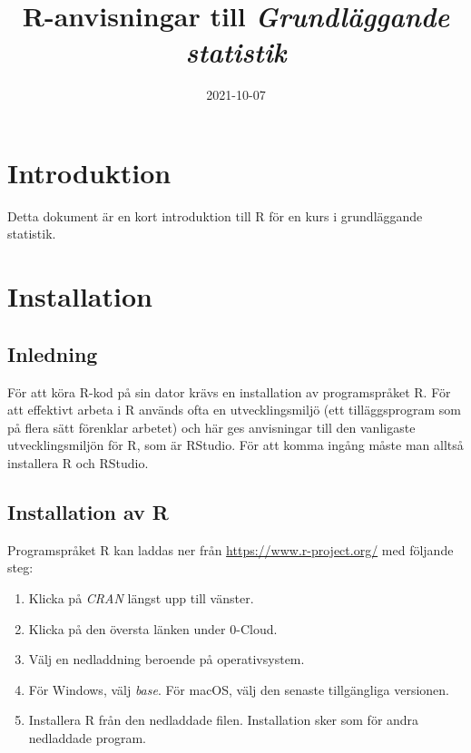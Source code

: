 \documentclass[
]{book}
\title{R-anvisningar till \emph{Grundläggande statistik}}
\author{}
\date{\vspace{-2.5em}2021-10-07}
\providecommand{\tightlist}{%
  \setlength{\itemsep}{0pt}\setlength{\parskip}{0pt}}
\theoremstyle{definition}
\theoremstyle{definition}
\theoremstyle{definition}
\theoremstyle{definition}
\theoremstyle{remark}
\begin{document}
\maketitle

{
\setcounter{tocdepth}{1}
\tableofcontents
}
\hypertarget{introduktion}{%
\chapter{Introduktion}\label{introduktion}}

Detta dokument är en kort introduktion till R för en kurs i grundläggande statistik.

\hypertarget{installation}{%
\chapter{Installation}\label{installation}}

\hypertarget{inledning}{%
\section{Inledning}\label{inledning}}

För att köra R-kod på sin dator krävs en installation av programspråket R. För att effektivt arbeta i R används ofta en utvecklingsmiljö (ett tilläggsprogram som på flera sätt förenklar arbetet) och här ges anvisningar till den vanligaste utvecklingsmiljön för R, som är RStudio. För att komma ingång måste man alltså installera R och RStudio.

\hypertarget{installation-av-r}{%
\section{Installation av R}\label{installation-av-r}}

Programspråket R kan laddas ner från \url{https://www.r-project.org/} med följande steg:

\begin{enumerate}
\def\labelenumi{\arabic{enumi}.}
\tightlist
\item
  Klicka på \emph{CRAN} längst upp till vänster.
\item
  Klicka på den översta länken under 0-Cloud.
\item
  Välj en nedladdning beroende på operativsystem.
\item
  För Windows, välj \emph{base}. För macOS, välj den senaste tillgängliga versionen.
\item
  Installera R från den nedladdade filen. Installation sker som för andra nedladdade program.
\end{enumerate}
\end{document}
